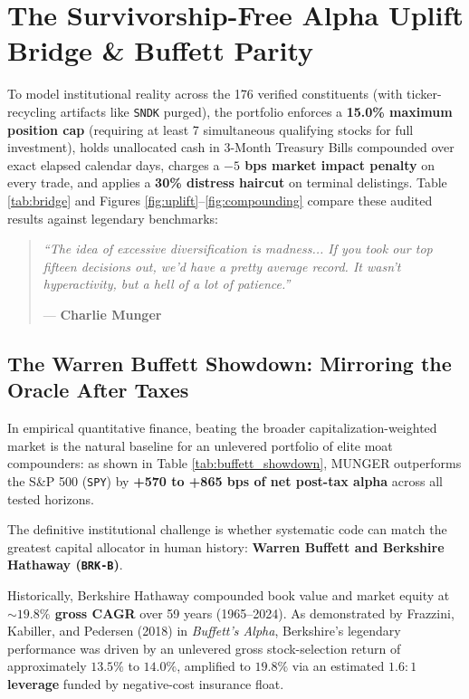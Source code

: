 \documentclass[10pt,twocolumn]{article}
\begin{document}
\section{The Survivorship-Free Alpha Uplift Bridge \& Buffett Parity}
To model institutional reality across the 176 verified constituents (with ticker-recycling artifacts like \texttt{SNDK} purged), the portfolio enforces a \textbf{15.0\% maximum position cap} (requiring at least 7 simultaneous qualifying stocks for full investment), holds unallocated cash in 3-Month Treasury Bills compounded over exact elapsed calendar days, charges a \textbf{$-5$ bps market impact penalty} on every trade, and applies a \textbf{30\% distress haircut} on terminal delistings. Table \ref{tab:bridge} and Figures \ref{fig:uplift}--\ref{fig:compounding} compare these audited results against legendary benchmarks:
\begin{quote}
\small\itshape ``The idea of excessive diversification is madness... If you took our top fifteen decisions out, we'd have a pretty average record. It wasn't hyperactivity, but a hell of a lot of patience.''
\par\hfill\upshape --- \textbf{Charlie Munger}
\end{quote}

\subsection{The Warren Buffett Showdown: Mirroring the Oracle After Taxes}
In empirical quantitative finance, beating the broader capitalization-weighted market is the natural baseline for an unlevered portfolio of elite moat compounders: as shown in Table \ref{tab:buffett_showdown}, MUNGER outperforms the S\&P 500 (\texttt{SPY}) by \textbf{+570 to +865 bps of net post-tax alpha} across all tested horizons.

The definitive institutional challenge is whether systematic code can match the greatest capital allocator in human history: \textbf{Warren Buffett and Berkshire Hathaway (\texttt{BRK-B})}.

Historically, Berkshire Hathaway compounded book value and market equity at \textbf{$\sim 19.8\%$ gross CAGR} over 59 years (1965--2024). As demonstrated by Frazzini, Kabiller, and Pedersen (2018) in \textit{Buffett's Alpha}, Berkshire's legendary performance was driven by an unlevered gross stock-selection return of approximately $13.5\%$ to $14.0\%$, amplified to $19.8\%$ via an estimated \textbf{$1.6:1$ leverage} funded by negative-cost insurance float.
\end{document}
